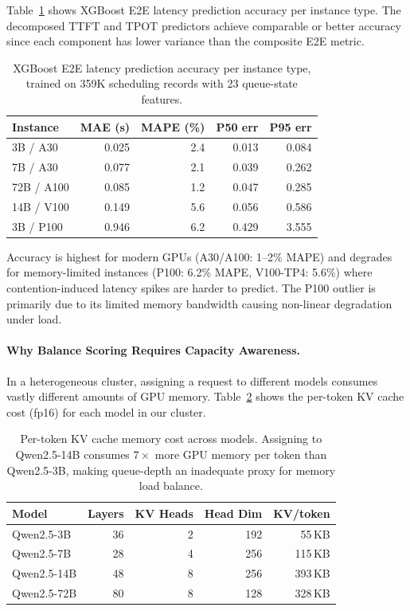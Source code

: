 \documentclass[letterpaper, anonymous, twocolumn, 10pt]{article}
\begin{document}
Table~\ref{tab:latency_prediction} shows XGBoost E2E latency prediction accuracy per instance type. The decomposed TTFT and TPOT predictors achieve comparable or better accuracy since each component has lower variance than the composite E2E metric.

\begin{table}[t]
\centering
\small
\caption{XGBoost E2E latency prediction accuracy per instance type, trained on 359K scheduling records with 23 queue-state features.}
\label{tab:latency_prediction}
\begin{tabular}{lrrrr}
\hline
Instance & MAE (s) & MAPE (\%) & P50 err & P95 err \\
\hline
3B / A30 & 0.025 & 2.4 & 0.013 & 0.084 \\
7B / A30 & 0.077 & 2.1 & 0.039 & 0.262 \\
72B / A100 & 0.085 & 1.2 & 0.047 & 0.285 \\
14B / V100 & 0.149 & 5.6 & 0.056 & 0.586 \\
3B / P100 & 0.946 & 6.2 & 0.429 & 3.555 \\
\hline
\end{tabular}
\end{table}

Accuracy is highest for modern GPUs (A30/A100: 1--2\% MAPE) and degrades for memory-limited instances (P100: 6.2\% MAPE, V100-TP4: 5.6\%) where contention-induced latency spikes are harder to predict. The P100 outlier is primarily due to its limited memory bandwidth causing non-linear degradation under load.

\paragraph{Why Balance Scoring Requires Capacity Awareness.}
In a heterogeneous cluster, assigning a request to different models consumes vastly different amounts of GPU memory.
Table~\ref{tab:kv_capacity} shows the per-token KV cache cost (fp16) for each model in our cluster.

\begin{table}[t]
\centering
\small
\caption{Per-token KV cache memory cost across models. Assigning to Qwen2.5-14B consumes $7\times$ more GPU memory per token than Qwen2.5-3B, making queue-depth an inadequate proxy for memory load balance.}
\label{tab:kv_capacity}
\begin{tabular}{lrrrr}
\hline
Model & Layers & KV Heads & Head Dim & KV/token \\
\hline
Qwen2.5-3B & 36 & 2 & 192 & 55\,KB \\
Qwen2.5-7B & 28 & 4 & 256 & 115\,KB \\
Qwen2.5-14B & 48 & 8 & 256 & 393\,KB \\
Qwen2.5-72B & 80 & 8 & 128 & 328\,KB \\
\hline
\end{tabular}
\end{table}
\end{document}
